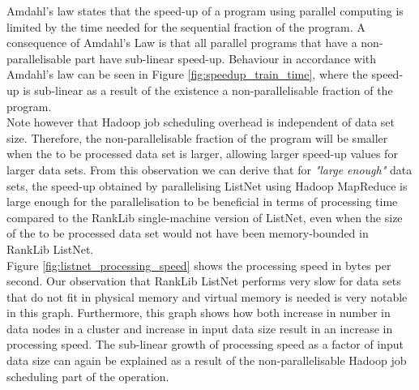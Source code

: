 Amdahl's law states that the speed-up of a program using parallel computing is limited by the time needed for the sequential fraction of the program. A consequence of Amdahl's Law is that all parallel programs that have a non-parallelisable part have sub-linear speed-up. Behaviour in accordance with Amdahl's law can be seen in Figure \ref{fig:speedup_train_time}, where the speed-up is sub-linear as a result of the existence a non-parallelisable fraction of the program.\\

Note however that Hadoop job scheduling overhead is independent of data set size. Therefore, the non-parallelisable fraction of the program will be smaller when the to be processed data set is larger, allowing larger speed-up values for larger data sets. From this observation we can derive that for \emph{"large enough"} data sets, the speed-up obtained by parallelising ListNet using Hadoop MapReduce is large enough for the parallelisation to be beneficial in terms of processing time compared to the RankLib single-machine version of ListNet, even when the size of the to be processed data set would not have been memory-bounded in RankLib ListNet.\\

Figure \ref{fig:listnet_processing_speed} shows the processing speed in bytes per second. Our observation that RankLib ListNet performs very slow for data sets that do not fit in physical memory and virtual memory is needed is very notable in this graph. Furthermore, this graph shows how both increase in number in data nodes in a cluster and increase in input data size result in an increase in processing speed. The sub-linear growth of processing speed as a factor of input data size can again be explained as a result of the non-parallelisable Hadoop job scheduling part of the operation.\\

